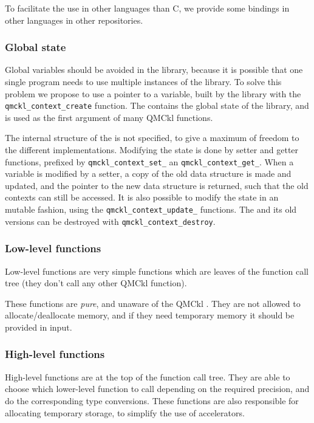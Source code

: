 To facilitate the  use in other languages than C,  we provide some
bindings in other languages in other repositories.

\subsubsection{Global state}

Global variables should  be avoided in the library,  because it is
possible that one  single program needs to  use multiple instances
of the library. To solve this  problem we propose to use a pointer
to a {\context}  variable,  built   by  the  library   with  the
\texttt{qmckl_context_create} function. The
{\context} contains the global state of the library, and is used as
the first argument of many \ac{QMCkl} functions.

The internal structure of the {\context}  is not specified, to give a
maximum of  freedom to  the different  implementations.  Modifying
the  state   is  done   by  setter   and  getter functions,   prefixed  by
\texttt{qmckl_context_set_}  an
\texttt{qmckl_context_get_}.
When a {\context} variable is modified by a setter, a copy of the old
data structure is made and updated, and the pointer to the new data
structure is returned, such that the old contexts can still be
accessed.  It is also possible to modify the state in an mutable
fashion, using the \texttt{qmckl_context_update_} functions.
The {\context} and its old versions can be destroyed with
\texttt{qmckl_context_destroy}.

\subsubsection{Low-level functions}

Low-level functions are very simple  functions which are leaves of
the function call tree (they don't call any other \ac{QMCkl} function).

These  functions   are   \emph{pure},   and  unaware   of   the   \ac{QMCkl}
{\context}. They are not allowed to allocate/deallocate memory, and
if they need temporary memory it should be provided in input.

\subsubsection{High-level functions}

High-level functions  are at  the top of  the function  call tree.
They  are  able  to  choose which  lower-level  function  to  call
depending on the required precision, and do the corresponding type
conversions.  These functions are  also responsible for allocating
temporary storage, to simplify the use of accelerators.

